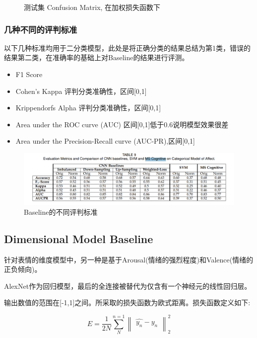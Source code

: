 \documentclass[11pt, a4paper]{article}
\begin{document}
\begin{CJK}{UTF8}{gbsn}
\begin{figure}[htbp]
	\caption{测试集 Confusion Matrix, 在加权损失函数下}
	\label{Fig:t8}
\end{figure}

\subsubsection{几种不同的评判标准}

以下几种标准均用于二分类模型，此处是将正确分类的结果总结为第1类，错误的结果第二类，在准确率的基础上对Baseline的结果进行评测。

\newpage
\begin{itemize}
\item F1 Score
\item Cohen's Kappa 评判分类准确性，区间[0,1]
\item Krippendorfs Alpha 评判分类准确性，区间[0,1]
\item Area under the ROC curve (AUC)  区间[0,1]低于0.6说明模型效果很差
\item Area under the Precision-Recall curve (AUC-PR),区间[0,1]
\end{itemize}


\begin{figure}[htbp]
	
	\centering %
	\includegraphics[width=15cm]{table9}
	
	\caption{Baseline的不同评判标准}
	\label{Fig:t9}
\end{figure}

\subsection{Dimensional Model Baseline}
针对表情的维度模型中，另一种是基于Arousal(情绪的强烈程度)和Valence(情绪的正负倾向)。

AlexNet作为回归模型，最后的全连接被替代为仅含有一个神经元的线性回归层。

输出数值的范围在[-1,1]之间。所采取的损失函数为欧式距离。损失函数定义如下:

\begin{equation}
E = \frac{1}{2N}\sum_{N}^{n=1} {\begin{Vmatrix}
\hat{y_n} - y_n\\ 
\end{Vmatrix}}^2_2
\end{equation}


\end{CJK}
\end{document}
